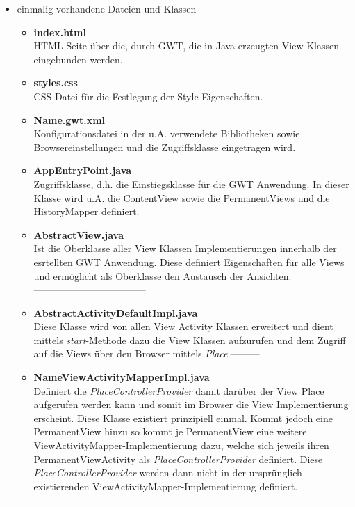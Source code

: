 \begin{itemize}
  \item einmalig vorhandene Dateien und Klassen
  \begin{itemize}
    \item \textbf{index.html}\\
    HTML Seite über die, durch GWT, die in Java erzeugten View Klassen
    eingebunden werden.
    \item \textbf{styles.css}\\
    CSS Datei für die Festlegung der Style-Eigenschaften.
    \item \textbf{\grqq{}Name\grqq{}.gwt.xml}\\
    Konfigurationsdatei in der u.A. verwendete Bibliotheken sowie
    Browsereinstellungen und die Zugriffsklasse eingetragen wird.
    \item \textbf{AppEntryPoint.java}\\
    Zugriffsklasse, d.h. die Einstiegsklasse für die GWT Anwendung. In dieser
    Klasse wird u.A. die ContentView sowie die PermanentViews und die
    HistoryMapper definiert.
    \item \textbf{AbstractView.java}\\
    Ist die Oberklasse aller View Klassen Implementierungen innerhalb der
    esrtellten GWT Anwendung. Diese definiert Eigenschaften für alle Views und
    ermöglicht als Oberklasse den Austausch der
    Ansichten.-----------------------------------
    \item \textbf{AbstractActivityDefaultImpl.java}\\
    Diese Klasse wird von allen View Activity Klassen erweitert und dient
    mittels \textit{start}-Methode dazu die View Klassen aufzurufen und dem
    Zugriff auf die Views über den Browser mittels \textit{Place}.---------
    \item \textbf{\grqq{}Name\grqq{}ViewActivityMapperImpl.java}\\
    Definiert die \textit{PlaceControllerProvider} damit darüber der View Place
    aufgerufen werden kann und somit im Browser die View Implementierung
    erscheint. Diese Klasse existiert prinzipiell einmal. Kommt jedoch eine
    PermanentView hinzu so kommt je PermanentView eine weitere
    ViewActivityMapper-Implementierung dazu, welche sich jeweils ihren
    PermanentViewActivity als \textit{PlaceControllerProvider}
    definiert. Diese \textit{PlaceControllerProvider} werden
    dann nicht in der ursprünglich existierenden
    ViewActivityMapper-Implementierung definiert.-----------------

\end{itemize}
\end{itemize}
